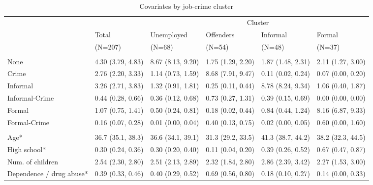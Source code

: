 
\renewcommand{\arraystretch}{0.8}
\begin{scriptsize}
{\setlength{\tabcolsep}{5pt}
\begin{longtable}{llllll} 
\caption{Covariates by job-crime cluster}%
 \label{tab:desc_jobs_crime_clusters}\\
\hline
\addlinespace
& & \multicolumn{4}{c}{Cluster} \\
\addlinespace
\cmidrule(lr){3-6} 
\addlinespace
& \multicolumn{1}{l}{Total} & \multicolumn{1}{l}{Unemployed} & \multicolumn{1}{l}{Offenders} & \multicolumn{1}{l}{Informal} & \multicolumn{1}{l}{Formal} \\
& \multicolumn{1}{l}{(N=207)} & \multicolumn{1}{l}{(N=68)} & \multicolumn{1}{l}{(N=54)} & \multicolumn{1}{l}{(N=48)} & \multicolumn{1}{l}{(N=37)} \\
\addlinespace[8pt]
\hline
\addlinespace[12pt]
\multicolumn{6}{l}{\textbf{Time spent on job (months)}} \\
\addlinespace
\quad None & 4.30 (3.79, 4.83) & 8.67 (8.13, 9.20) & 1.75 (1.29, 2.20) & 1.87 (1.48, 2.31) & 2.11 (1.27, 3.00) \\ 
  \quad Crime & 2.76 (2.20, 3.33) & 1.14 (0.73, 1.59) & 8.68 (7.91, 9.47) & 0.11 (0.02, 0.24) & 0.07 (0.00, 0.20) \\ 
  \quad Informal & 3.26 (2.71, 3.83) & 1.32 (0.91, 1.81) & 0.25 (0.11, 0.44) & 8.78 (8.24, 9.34) & 1.06 (0.40, 1.87) \\ 
  \quad Informal-Crime & 0.44 (0.28, 0.66) & 0.36 (0.12, 0.68) & 0.73 (0.27, 1.31) & 0.39 (0.15, 0.69) & 0.00 (0.00, 0.00) \\ 
  \quad Formal & 1.07 (0.75, 1.41) & 0.50 (0.24, 0.81) & 0.18 (0.02, 0.44) & 0.84 (0.44, 1.24) & 8.16 (6.87, 9.33) \\ 
  \quad Formal-Crime & 0.16 (0.07, 0.28) & 0.01 (0.00, 0.04) & 0.40 (0.13, 0.75) & 0.02 (0.00, 0.05) & 0.60 (0.00, 1.60) \\ 
  \addlinespace[12pt]
\multicolumn{6}{l}{\textbf{Covariates (average)*}} \\
\addlinespace
\quad Age* & 36.7 (35.1, 38.3) & 36.6 (34.1, 39.1) & 31.3 (29.2, 33.5) & 41.3 (38.7, 44.2) & 38.2 (32.3, 44.5) \\ 
  \quad High school* & 0.30 (0.24, 0.36) & 0.30 (0.20, 0.40) & 0.11 (0.04, 0.20) & 0.39 (0.26, 0.52) & 0.67 (0.47, 0.87) \\ 
  \quad Num. of children & 2.54 (2.30, 2.80) & 2.51 (2.13, 2.89) & 2.32 (1.84, 2.80) & 2.86 (2.39, 3.42) & 2.27 (1.53, 3.00) \\ 
  \quad Dependence / drug abuse* & 0.39 (0.33, 0.46) & 0.40 (0.29, 0.52) & 0.69 (0.56, 0.80) & 0.18 (0.10, 0.27) & 0.14 (0.00, 0.33) \\ 

\end{longtable}}
\end{scriptsize}
